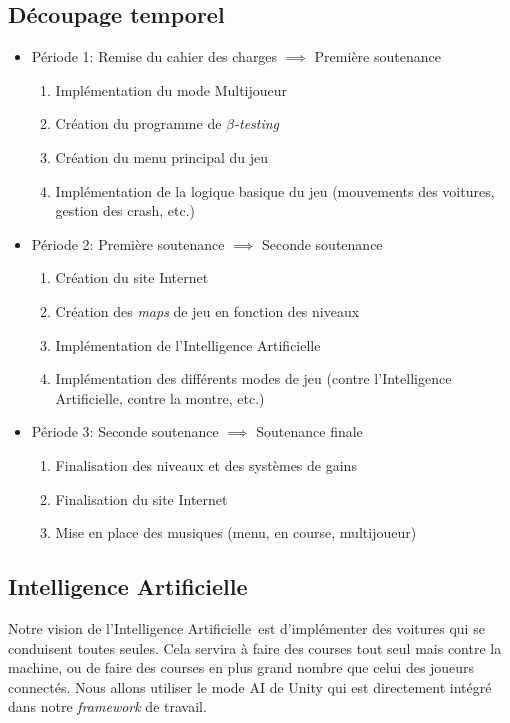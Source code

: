 \documentclass[11pt,a4paper]{article}
\newcommand{\AI}{Intelligence Artificielle}
\begin{document}
  \subsection{Découpage temporel}
    \begin{itemize}
      \item Période 1: Remise du cahier des charges \(\implies\) Première soutenance
        \begin{enumerate}
          \item Implémentation du mode Multijoueur
          \item Création du programme de \(\beta\)\textit{-testing}
          \item Création du menu principal du jeu
          \item Implémentation de la logique basique du jeu (mouvements des voitures, gestion des crash, etc.)
        \end{enumerate}
      \item Période 2: Première soutenance \(\implies\) Seconde soutenance
        \begin{enumerate}
          \item Création du site Internet
          \item Création des \textit{maps} de jeu en fonction des niveaux
          \item Implémentation de l'\AI
          \item Implémentation des différents modes de jeu (contre l'\AI, contre la montre, etc.)
        \end{enumerate}
      \item Période 3: Seconde soutenance \(\implies\) Soutenance finale
        \begin{enumerate}
          \item Finalisation des niveaux et des systèmes de gains
          \item Finalisation du site Internet
          \item Mise en place des musiques (menu, en course, multijoueur)
        \end{enumerate}
    \end{itemize}
  \subsection{\AI}
    Notre vision de l'\AI\, est d'implémenter des voitures qui se conduisent toutes seules.
    Cela servira à faire des courses tout seul mais contre la machine, ou de faire des courses en plus grand
    nombre que celui des joueurs connectés. Nous allons utiliser le mode AI de Unity qui est directement intégré
    dans notre \textit{framework} de travail.
\end{document}
